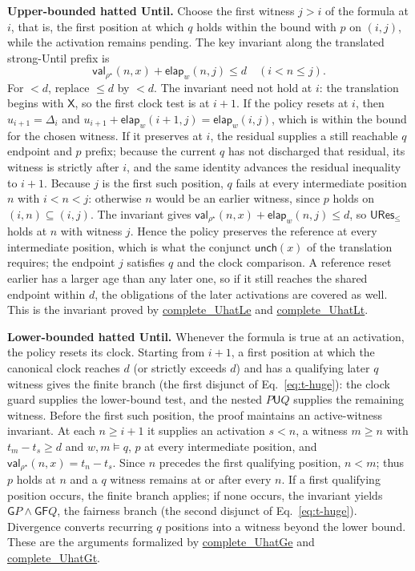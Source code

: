 \documentclass[manuscript]{acmart}
\newcommand{\Until}{\mathbin{\mathsf{U}}}
\newcommand{\Next}{\mathsf{X}}
\newcommand{\Always}{\mathsf{G}}
\newcommand{\Eventually}{\mathsf{F}}
\newcommand{\Unch}{\mathsf{unch}}
\newcommand{\CVal}{\mathsf{val}}
\newcommand{\elapsed}{\mathsf{elap}}
\newcommand{\runinhead}[1]{\par\noindent\textbf{#1}\enspace}
\newcommand{\Rocqid}[1]{\url{#1}}
\begin{document}
\runinhead{Upper-bounded hatted Until.}
Choose the first witness $j>i$ of the formula at $i$, that is, the first
position at which $q$ holds within the bound with $p$ on $(i,j)$, while
the activation remains pending. The
key invariant along the translated strong-Until prefix is
\begin{equation}
\CVal_{\rho^\star}(n,x)+\elapsed_w(n,j)\le d
\quad(i<n\le j).
\label{eq:canonical-until-invariant}
\end{equation}
For $<d$, replace $\le d$ by $<d$. The invariant need not hold at $i$:
the translation begins with $\Next$, so the first clock test is at $i+1$.
If the policy resets at $i$, then $u_{i+1}=\Delta_i$ and
$u_{i+1}+\elapsed_w(i+1,j)=\elapsed_w(i,j)$, which is within the bound for
the chosen witness. If it preserves at $i$, the residual supplies a still
reachable $q$ endpoint and $p$ prefix; because the current $q$ has not
discharged that residual, its witness is strictly after $i$, and the same
identity advances the residual inequality to $i+1$. Because $j$ is the first such
position, $q$ fails at every intermediate position $n$ with $i<n<j$: otherwise
$n$ would be an earlier witness, since $p$ holds on $(i,n)\subseteq(i,j)$. The
invariant gives $\CVal_{\rho^\star}(n,x)+\elapsed_w(n,j)\le d$, so
$\mathsf{URes}_{\le}$ holds at $n$ with witness $j$. Hence the policy preserves
the reference at every intermediate position, which is what the conjunct
$\Unch(x)$ of the translation requires; the endpoint $j$ satisfies $q$ and the
clock comparison. A reference reset earlier has a larger age than any later
one, so if it still reaches the shared endpoint within $d$, the obligations of
the later activations are covered as well. This is the invariant proved
by \Rocqid{complete_UhatLe} and \Rocqid{complete_UhatLt}.

\runinhead{Lower-bounded hatted Until.}
Whenever the formula is true at an activation, the policy resets its clock.
Starting from $i+1$, a first position at which the canonical clock reaches
$d$ (or strictly exceeds $d$) and has a qualifying later $q$ witness gives
the finite branch (the first disjunct of Eq.~\eqref{eq:t-huge}): the clock guard supplies the lower-bound
test, and the nested $P\Until Q$ supplies the remaining witness. Before the
first such position, the proof maintains an active-witness invariant. At
each $n\ge i+1$ it supplies an activation $s<n$, a witness $m\ge n$ with
$t_m-t_s\ge d$ and $w,m\models q$, $p$ at every intermediate position, and
$\CVal_{\rho^\star}(n,x)=t_n-t_s$. Since $n$ precedes the first qualifying position, $n<m$; thus $p$ holds at
$n$ and a $q$ witness
remains at or after every $n$. If a first qualifying position occurs, the
finite branch applies; if none occurs, the invariant yields
$\Always P\land\Always\Eventually Q$, the fairness branch (the second disjunct of Eq.~\eqref{eq:t-huge}).
Divergence converts recurring $q$ positions into a witness beyond the
lower bound. These are the arguments
formalized by \Rocqid{complete_UhatGe} and \Rocqid{complete_UhatGt}.
\end{document}
